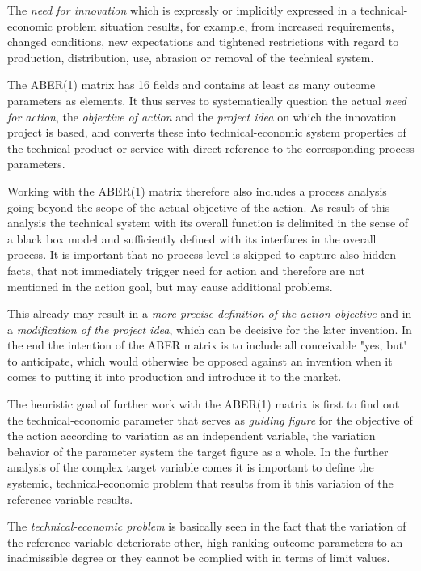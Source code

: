 \documentclass[11pt,a4paper]{article}
\begin{document}
The \emph{need for innovation} which is expressly or implicitly expressed in a
technical-economic problem situation results, for example, from increased
requirements, changed conditions, new expectations and tightened restrictions
with regard to production, distribution, use, abrasion or removal of the
technical system.

The ABER(1) matrix has 16 fields and contains at least as many outcome
parameters as elements. It thus serves to systematically question the actual
\emph{need for action}, the \emph{objective of action} and the \emph{project
  idea} on which the innovation project is based, and converts these into
technical-economic system properties of the technical product or service with
direct reference to the corresponding process parameters.

Working with the ABER(1) matrix therefore also includes a process analysis
going beyond the scope of the actual objective of the action. As result of
this analysis the technical system with its overall function is delimited in
the sense of a black box model and sufficiently defined with its interfaces in
the overall process. It is important that no process level is skipped to
capture also hidden facts, that not immediately trigger need for action and
therefore are not mentioned in the action goal, but may cause additional
problems.

This already may result in a \emph{more precise definition of the action
  objective} and in a \emph{modification of the project idea}, which can be
decisive for the later invention. In the end the intention of the ABER matrix
is to include all conceivable "yes, but" to anticipate, which would otherwise
be opposed against an invention when it comes to putting it into production
and introduce it to the market.

The heuristic goal of further work with the ABER(1) matrix is first to find
out the technical-economic parameter that serves as \emph{guiding figure} for
the objective of the action according to variation as an independent variable,
the variation behavior of the parameter system the target figure as a
whole. In the further analysis of the complex target variable comes it is
important to define the systemic, technical-economic problem that results from
it this variation of the reference variable results.

The \emph{technical-economic problem} is basically seen in the fact that the
variation of the reference variable deteriorate other, high-ranking outcome
parameters to an inadmissible degree or they cannot be complied with in terms
of limit values.
\end{document}
